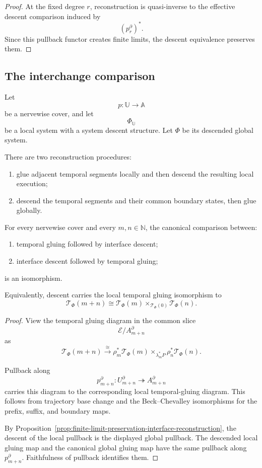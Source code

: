\begin{proof}
At the fixed degree \(r\), reconstruction is quasi-inverse to the effective
descent comparison induced by
\[
    (p_r^\partial)^\ast.
\]
Since this pullback functor creates finite limits, the descent equivalence
preserves them.
\end{proof}

\subsection{The interchange comparison}
\label{subsec:temporal-interface-interchange-comparison}

Let
\[
    p:\mathbb U\to\mathbb A
\]
be a nervewise cover, and let
\[
    \Phi_{\mathbb U}
\]
be a local system with a system descent structure. Let \(\Phi\) be its
descended global system.

There are two reconstruction procedures:
\begin{enumerate}
    \item glue adjacent temporal segments locally and then descend the
    resulting local execution;
    \item descend the temporal segments and their common boundary states, then
    glue globally.
\end{enumerate}

\begin{theorem}
\label{thm:temporal-interface-interchange-rigorous}
For every nervewise cover and every \(m,n\in\mathbb N\), the canonical
comparison between:
\begin{enumerate}
    \item temporal gluing followed by interface descent;
    \item interface descent followed by temporal gluing;
\end{enumerate}
is an isomorphism.

Equivalently, descent carries the local temporal gluing isomorphism to
\[
    \mathscr T_\Phi(m+n)
    \cong
    \mathscr T_\Phi(m)
    \times_{\mathscr T_\Phi(0)}
    \mathscr T_\Phi(n).
\]
\end{theorem}

\begin{proof}
View the temporal gluing diagram in the common slice
\[
    \mathcal E/A_{m+n}^\partial
\]
as
\[
    \mathscr T_\Phi(m+n)
    \xrightarrow{\cong}
    \rho_m^\ast\mathscr T_\Phi(m)
    \times_{\lambda_m^\ast P}
    \rho_n^\ast\mathscr T_\Phi(n).
\]

Pullback along
\[
    p_{m+n}^\partial:
    U_{m+n}^\partial\twoheadrightarrow A_{m+n}^\partial
\]
carries this diagram to the corresponding local temporal-gluing diagram.
This follows from trajectory base change and the Beck--Chevalley
isomorphisms for the prefix, suffix, and boundary maps.

By
Proposition~\ref{prop:finite-limit-preservation-interface-reconstruction},
the descent of the local pullback is the displayed global pullback. The
descended local gluing map and the canonical global gluing map have the same
pullback along \(p_{m+n}^\partial\). Faithfulness of pullback identifies them.
\end{proof}

